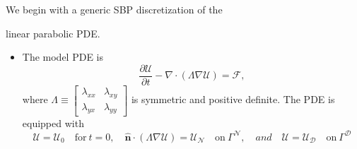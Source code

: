 \documentclass[final]{beamer}
\newlength{\firstcolwid}
\newcommand{\fnc}[1]{\ensuremath{\mathcal{#1}}}
\begin{document}
\begin{frame}[t]
\begin{columns}[t]
\begin{column}{\firstcolwid}
\vskip-0.6cm
%
%
\begin{alertblock}{We begin with a generic SBP discretization of the 
        
        linear parabolic PDE.}
\begin{itemize}
    \item The model PDE is 
    \small
    \begin{equation*}
    \frac{\partial \fnc{U}}{\partial t} - \nabla\cdot\left( \Lambda \nabla \fnc{U} \right) = \fnc{F},
    \end{equation*}
    \normalfont
    where 
    \small
    $
    \Lambda \equiv \left[\begin{smallmatrix} \lambda_{xx} & \lambda_{xy}\\ 
    \lambda_{yx} & \lambda_{yy} \end{smallmatrix}\right]
    $ 
    \normalfont
    is symmetric and positive definite. The PDE is equipped with
    \small
    \begin{equation*} 
        \fnc{U} = \fnc{U}_{0} \quad \text{for}\: t=0, \quad
        \hat{\bm{n}} \cdot \left( \Lambda\nabla \fnc{U}\right) = \fnc{U}_\fnc{N}
        \quad \text{on}\: \Gamma^\fnc{N}, \quad and \quad
        \fnc{U} = \fnc{U}_\fnc{D} \quad \text{on}\: \Gamma^\fnc{D}
    \end{equation*}
    \normalfont
   
    
        

\end{itemize}
\end{alertblock}
\end{column}
\end{columns}
\end{frame}
\end{document}
